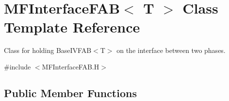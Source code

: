 \hypertarget{classMFInterfaceFAB}{}\section{M\+F\+Interface\+F\+AB$<$ T $>$ Class Template Reference}
\label{classMFInterfaceFAB}


Class for holding Base\+I\+V\+F\+A\+B$<$\+T$>$ on the interface between two phases.  




{\ttfamily \#include $<$M\+F\+Interface\+F\+A\+B.\+H$>$}

\subsection*{Public Member Functions}
